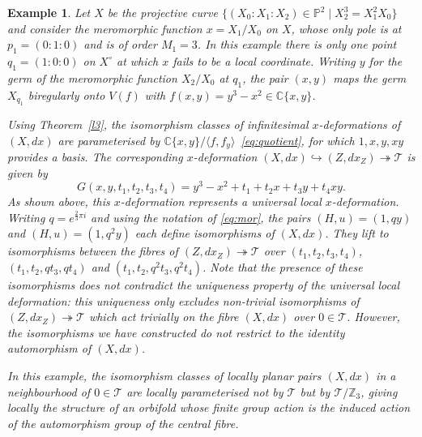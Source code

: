 \documentclass[11pt,twoside]{amsart}
\theoremstyle{plain}
\newtheorem{Example}[theorem]{Example}
\newcommand{\C}{\mathbb{C}}
\newcommand{\Tm}{\mathcal{T}}
\newcommand{\verteq}{\rotatebox{90}{$\,=$}}
\DeclareMathOperator{\dis}{Dis}
\newcommand{\ci}{i}
\newcommand{\dfx}{dx}
\begin{document}
\begin{Example}\label{e1}
Let $X$ be the projective curve $\{(X_0:X_1:X_2)\in\mathbb{P}^2\mid X_2^3=X_1^2X_0\}$ and consider the meromorphic function $x=X_1/X_0$ on $X$, whose only pole is at $p_1=(0:1:0)$ and is of order $M_1=3$. In this example there is only one point $q_1=(1:0:0)$ on $X^\circ$ at which $x$ fails to be a local coordinate. Writing $y$ for the germ of the meromorphic function $X_2/X_0$ at $q_1$, the pair $(x,y)$ maps the germ $X_{q_1}$ biregularly onto $V(f)$ with $f(x,y)=y^3-x^2\in\mathbb{C}\{x,y\}$.

Using Theorem~\ref {l3}, %
the isomorphism classes of infinitesimal $x$-deforma\-tions of $ (X,\dfx) $ are parameterised by ${\C\{x, y\}}/{\langle f, f_y\rangle} $~\eqref{eq:quotient}, for which $1,x,y,xy$ provides a basis. The corresponding $x$-deformation $(X,\dfx)\hookrightarrow(Z,\dfx_Z)\twoheadrightarrow\Tm $ is given by
$$G(x,y,t_1,t_2,t_3,t_4)=y^3-x^2+t_1+t_2x+t_3y+t_4xy . $$
As shown above, this $x$-deformation represents a universal local $x$-deformation.
Writing $q=e^{\frac{2}{3}\pi\ci}$ and using the notation of  \eqref {eq:mor},  the pairs $(H,u)=(1,qy)$ and $(H,u)=(1,q^2y)$ each define isomorphisms of $ (X,\dfx) $. They lift to  %
isomorphisms between the fibres of $ (Z,\dfx_Z)\twoheadrightarrow\Tm $ over $(t_1,t_2,t_3,t_4)$, $(t_1,t_2,qt_3,qt_4)$ and $(t_1,t_2,q^2t_3,q^2t_4)$. 
 Note that the presence of these isomorphisms does not contradict the uniqueness property of the universal local deformation: this uniqueness only excludes non-trivial isomorphisms of $(Z,\dfx_Z)\twoheadrightarrow\mathcal T $ which act trivially on the fibre $(X,\dfx)$ over $0\in\Tm$. However, the isomorphisms we have constructed do not restrict to the identity automorphism of $(X,\dfx)$.

In this example, the isomorphism classes of locally planar pairs $(X,d x) $ in a neighbourhood of $0\in\Tm$ are locally parameterised not by $\Tm $ but by $\Tm/\mathbb Z_3 $, giving locally the structure of an orbifold whose
finite group action is the induced action of the automorphism group of the central fibre. %
\end{Example}
\end{document}
